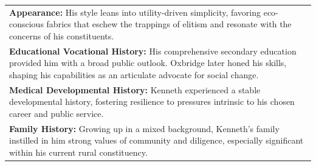 \documentclass[11pt]{article}
\begin{document}
\begin{table}[ht]
\begin{tabularx}{\textwidth}{X}
\textbf{Appearance:} His style leans into utility-driven simplicity, favoring eco-conscious fabrics that eschew the trappings of elitism and resonate with the concerns of his constituents. \\[4pt]

\textbf{Educational Vocational History:} His comprehensive secondary education provided him with a broad public outlook. Oxbridge later honed his skills, shaping his capabilities as an articulate advocate for social change. \\[4pt]

\textbf{Medical Developmental History:} Kenneth experienced a stable developmental history, fostering resilience to pressures intrinsic to his chosen career and public service. \\[4pt]

\textbf{Family History:} Growing up in a mixed background, Kenneth's family instilled in him strong values of community and diligence, especially significant within his current rural constituency. \\[4pt]

\bottomrule
\end{tabularx}
\end{table}
\end{document}
